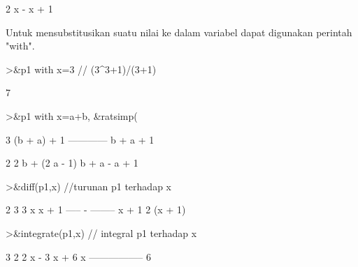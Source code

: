 \documentclass{article}
\newenvironment{eulernotebook}{\par}{\par}
\newenvironment{eulercomment}{\par\medskip}{\par\medskip}
\begin{document}
\begin{eulernotebook}
\begin{euleroutput}
                                 2
                                x  - x + 1
  
\end{euleroutput}
\begin{eulercomment}
Untuk mensubstitusikan suatu nilai ke dalam variabel dapat digunakan perintah
"with".
\end{eulercomment}
\begin{eulerprompt}
>&p1 with x=3 // (3^3+1)/(3+1)
\end{eulerprompt}
\begin{euleroutput}
  
                                    7
  
\end{euleroutput}
\begin{eulerprompt}
>&p1 with x=a+b, &ratsimp(%
\end{eulerprompt}
\begin{euleroutput}
  
                                      3
                               (b + a)  + 1
                               ------------
                                b + a + 1
  
  
                       2                  2
                      b  + (2 a - 1) b + a  - a + 1
  
\end{euleroutput}
\begin{eulerprompt}
>&diff(p1,x) //turunan p1 terhadap x
\end{eulerprompt}
\begin{euleroutput}
  
                                2      3
                             3 x      x  + 1
                             ----- - --------
                             x + 1          2
                                     (x + 1)
  
\end{euleroutput}
\begin{eulerprompt}
>&integrate(p1,x) // integral p1 terhadap x
\end{eulerprompt}
\begin{euleroutput}
  
                               3      2
                            2 x  - 3 x  + 6 x
                            -----------------
                                    6
  

\end{euleroutput}
\end{eulernotebook}
\end{document}
